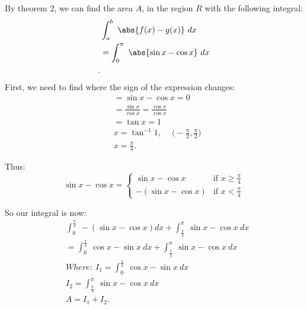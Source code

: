 \documentclass{report}
\begin{document}
    \begin{minipage}{0.47\textwidth}
        By theorem 2, we can find the area $A$, in the region $R$ with the following integral:
        \begin{align*}
            &\int_{a}^{b}\ \abs{f(x)-g(x)}\ dx \\
            &=\int_{0}^{\pi}\ \abs{\sin{x}-\cos{x}}\ dx \\
        .\end{align*}
        First, we need to find where the sign of the expression changes:
        \begin{align*}
            &=\sin{x} - \cos{x} = 0 \\
            &=\frac{\sin{x}}{\cos{x}} = \frac{\cos{x}}{\cos{x}} \\
            &=\tan{x} = 1 \\
            &x = \tan^{-1}{1},\ \quad \bigg(-\frac{\pi}{2},\frac{\pi}{2}\bigg) \\
            &x= \frac{\pi}{4}
        .\end{align*}
    \end{minipage}
    \pagebreak \bigbreak \noindent 
    \begin{minipage}{0.47\textwidth}
        Thus:
           \begin{equation}
            \sin{x} - \cos{x}=
                \begin{cases}
                     \sin{x}-\cos{x}& \text{if } x \geq \frac{\pi}{4} \\
                     -(\sin{x}-\cos{x})& \text{if } x < \frac{\pi}{4} 
                \end{cases}
            \end{equation}
    \end{minipage}
    \begin{minipage}[t]{0.47\textwidth}
        So our integral is now:
        \begin{align*}
            &\int_{0}^{\frac{\pi}{4}}\ -(\sin{x}-\cos{x}) dx + \int_{\frac{\pi}{4}}^{\pi}\ \sin{x}-\cos{x}\ dx \\
            &=\int_{0}^{\frac{\pi}{4}}\ \cos{x}-\sin{x}\ dx + \int_{\frac{\pi}{4}}^{\pi}\ \sin{x}-\cos{x}\ dx \\
            &Where:\ I_{1} = \int_{0}^{\frac{\pi}{4}}\ \cos{x}-\sin{x}\ dx \\
            &I_{2} = \int_{\frac{\pi}{4}}^{\pi}\ \sin{x}-\cos{x}\ dx \\
            &A = I_{1} + I_{2}
        .\end{align*}
    \end{minipage}
\end{document}
